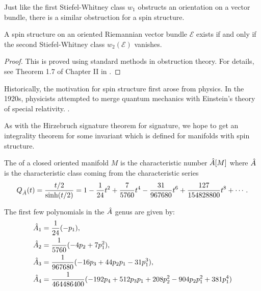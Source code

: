 Just like the first Stiefel-Whitney class $w_1$ obstructs an orientation on a vector bundle, there is a similar obstruction for a spin structure.

\begin{theorem}
	A spin structure on an oriented Riemannian vector bundle $\mathcal{E}$ exists if and only if the second Stiefel-Whitney class $w_2(\mathcal{E})$ vanishes.
\end{theorem}
\begin{proof}
	This is proved using standard methods in obstruction theory. For details, see Theorem 1.7 of Chapter II in \cite{lawson1989spin}.
\end{proof}

\begin{remark}
	Historically, the motivation for spin structure first arose from physics. In the 1920s, physicists attempted to merge quantum mechanics with Einstein's theory of special relativity. .
\end{remark}

As with the Hirzebruch signature theorem for signature, we hope to get an integrality theorem for some invariant which is defined for manifolds with spin structure. 

\begin{definition}
	The  of a closed oriented manifold $M$ is the characteristic number $\hat{A}[M]$ where $\hat{A}$ is the characteristic class coming from the characteristic series
	\[
		Q_{\hat{A}}(t) = \frac{t/2}{\sinh(t/2)} = 1 - \frac{1}{24} t^2 + \frac{7}{5760} t^4 - \frac{31}{967680} t^6 + \frac{127}{154828800}t^8+\cdots.
	\]
\end{definition}

\begin{example}
	The first few polynomials in the $\hat{A}$ genus are given by:
\[
	\begin{aligned}
		\hat{A}_1 &= \frac{1}{24}(-p_1),\\
		\hat{A}_2 &= \frac{1}{5760}(-4p_2 + 7p_1^2),\\
		\hat{A}_3 &= \frac{1}{967680}(-16p_3+44p_2p_1-31p_1^3),\\
		\hat{A}_4 &= \frac{1}{464486400}(-192p_4+512p_3p_1+208p_2^2-904p_2p_1^2+381p_1^4)
	\end{aligned}
\]
\end{example}

